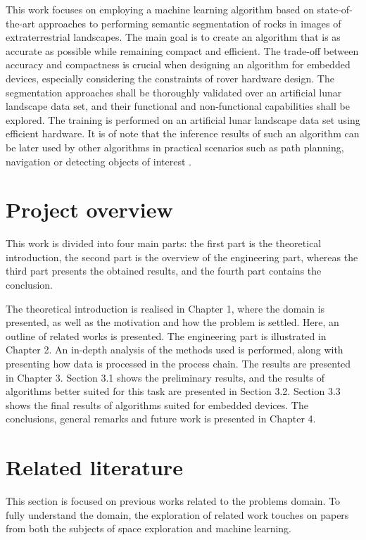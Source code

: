 \documentclass[a4paper,twoside,12pt]{book}
\begin{document}
This work focuses on employing a machine learning algorithm based on state-of-the-art approaches to performing semantic segmentation of rocks in images of extraterrestrial landscapes. The main goal is to create an algorithm that is as accurate as possible while remaining compact and efficient. The trade-off between accuracy and compactness is crucial when designing an algorithm for embedded devices, especially considering the constraints of rover hardware design. The segmentation approaches shall be thoroughly validated over an artificial lunar landscape data set, and their functional and non-functional capabilities shall be explored. The training is performed on an artificial lunar landscape data set using efficient hardware. It is of note that the inference results of such an algorithm can be later used by other algorithms in practical scenarios such as path planning, navigation or detecting objects of interest \cite{7119022}.

\section{Project overview}
This work is divided into four main parts: the first part is the theoretical introduction, the second part is the overview of the engineering part, whereas the third part presents the obtained results, and the fourth part contains the conclusion.


The theoretical introduction is realised in Chapter 1, where the domain is presented, as well as the motivation and how the problem is settled. Here, an outline of related works is presented. The engineering part is illustrated in Chapter 2. An in-depth analysis of the methods used is performed, along with presenting how data is processed in the process chain. The results are presented in Chapter 3. Section 3.1 shows the preliminary results, and the results of algorithms better suited for this task are presented in Section 3.2. Section 3.3 shows the final results of algorithms suited for embedded devices. The conclusions, general remarks and future work is presented in Chapter 4.

\section{Related literature}

This section is focused on previous works related to the problems domain. To fully understand the domain, the exploration of related work touches on papers from both the subjects of space exploration and machine learning.
\end{document}
